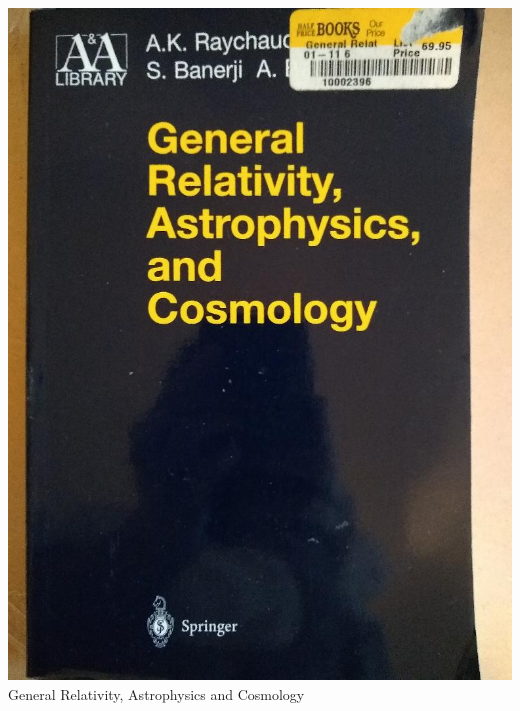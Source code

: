 \documentclass[t]{beamer}
\newcommand{\htarget}[2]{\hypertarget{#1}{#2}}
\begin{document}
\begin{frame}\htarget{GAC}{} \begin{center}
\includegraphics[height=0.8\textheight]{General_Relativity_Astrophysics_and_Cosmology_mini.jpg} \\
General Relativity, Astrophysics and Cosmology
\end{center} \end{frame}
\end{document}
